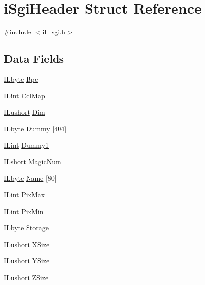 \hypertarget{structi_sgi_header}{\section{i\-Sgi\-Header Struct Reference}
\label{structi_sgi_header}
}


{\ttfamily \#include $<$il\-\_\-sgi.\-h$>$}

\subsection*{Data Fields}
\begin{DoxyCompactItemize}
\item 
\hyperlink{il_8h_a88e562dacd22f4efcf6f9d31b85d4f92}{I\-Lbyte} \hyperlink{structi_sgi_header_ac4f16ab89a1a291e3990d993b5afd52d}{Bpc}
\item 
\hyperlink{il_8h_a288a97fb9e92e707a60b749d0039fafe}{I\-Lint} \hyperlink{structi_sgi_header_a83558c739c57452b2daef271ddf68c41}{Col\-Map}
\item 
\hyperlink{il_8h_af6287b43748354a7c4864da43ae56962}{I\-Lushort} \hyperlink{structi_sgi_header_a91d0411aa3525b5f973251875bd1ed2d}{Dim}
\item 
\hyperlink{il_8h_a88e562dacd22f4efcf6f9d31b85d4f92}{I\-Lbyte} \hyperlink{structi_sgi_header_abdddfc218e4c164ae393a8c54d689a02}{Dummy} \mbox{[}404\mbox{]}
\item 
\hyperlink{il_8h_a288a97fb9e92e707a60b749d0039fafe}{I\-Lint} \hyperlink{structi_sgi_header_ae24e7006cfe0c3be8a1ba665210078f7}{Dummy1}
\item 
\hyperlink{il_8h_afc75ded918970afe7517d3f7f0561db3}{I\-Lshort} \hyperlink{structi_sgi_header_aa881815e8637b96acf474e38f573b307}{Magic\-Num}
\item 
\hyperlink{il_8h_a88e562dacd22f4efcf6f9d31b85d4f92}{I\-Lbyte} \hyperlink{structi_sgi_header_a985c930065efd2a484c1dbac1315ca5b}{Name} \mbox{[}80\mbox{]}
\item 
\hyperlink{il_8h_a288a97fb9e92e707a60b749d0039fafe}{I\-Lint} \hyperlink{structi_sgi_header_aebe02c5c8d971ad1c1c547afd8cfe94a}{Pix\-Max}
\item 
\hyperlink{il_8h_a288a97fb9e92e707a60b749d0039fafe}{I\-Lint} \hyperlink{structi_sgi_header_a01cce63c69bff9c2311a01cb731a9d4f}{Pix\-Min}
\item 
\hyperlink{il_8h_a88e562dacd22f4efcf6f9d31b85d4f92}{I\-Lbyte} \hyperlink{structi_sgi_header_a2e92481d5d357f185cf220b8296a4475}{Storage}
\item 
\hyperlink{il_8h_af6287b43748354a7c4864da43ae56962}{I\-Lushort} \hyperlink{structi_sgi_header_aa79ea76c669058712ff79876dd6f69b3}{X\-Size}
\item 
\hyperlink{il_8h_af6287b43748354a7c4864da43ae56962}{I\-Lushort} \hyperlink{structi_sgi_header_a129f6de9fd35429ab8f5fafeea9bf54c}{Y\-Size}
\item 
\hyperlink{il_8h_af6287b43748354a7c4864da43ae56962}{I\-Lushort} \hyperlink{structi_sgi_header_aa134f9ab8311e8a4c75506524245c18a}{Z\-Size}
\end{DoxyCompactItemize}


